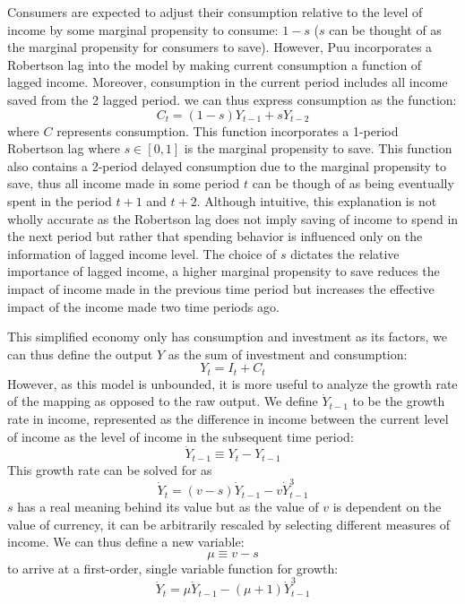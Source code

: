 Consumers are expected to adjust their consumption relative to the level of income by some marginal propensity to consume: $1-s$ ($s$ can be thought of as the marginal propensity for consumers to save). However, Puu incorporates a Robertson lag into the model by making current consumption a function of lagged income. Moreover, consumption in the current period includes all income saved from the 2 lagged period. we can thus express consumption as the function:
\begin{equation}
    C_t = (1-s)Y_{t-1}+sY_{t-2}
\end{equation}
where $C$ represents consumption. This function incorporates a 1-period Robertson lag where $s\in[0,1]$ is the marginal propensity to save. This function also contains a 2-period delayed consumption due to the marginal propensity to save, thus all income made in some period $t$ can be though of as being eventually spent in the period $t+1$ and $t+2$. Although intuitive, this explanation is not wholly accurate as the Robertson lag does not imply saving of income to spend in the next period but rather that spending behavior is influenced only on the information of lagged income level. The choice of $s$ dictates the relative importance of lagged income, a higher marginal propensity to save reduces the impact of income made in the previous time period but increases the effective impact of the income made two time periods ago.  

This simplified economy only has consumption and investment as its factors, we can thus define the output $Y$ as the sum of investment and consumption:
\begin{equation}
    Y_t=I_t+C_t
\end{equation}
However, as this model is unbounded, it is more useful to analyze the growth rate of the mapping as opposed to the raw output. We define $\dot Y_{t-1}$ to be the growth rate in income, represented as the difference in income between the current level of income as the level of income in the subsequent time period:
\begin{equation}
    \dot Y_{t-1}\equiv Y_t-Y_{t-1}
\end{equation}
This growth rate can be solved for as
\begin{equation*}
    \dot Y_t=(v-s)\dot Y_{t-1}-v\dot Y_{t-1}^3
\end{equation*}
$s$ has a real meaning behind its value but as the value of $v$ is dependent on the value of currency, it can be arbitrarily rescaled by selecting different measures of income. We can thus define a new variable:
\begin{equation*}
    \mu\equiv v-s
\end{equation*}
to arrive at a first-order, single variable function for growth:
\begin{equation}
    \dot Y_t=\mu \dot Y_{t-1}-(\mu+1)\dot Y_{t-1}^3
\end{equation}

